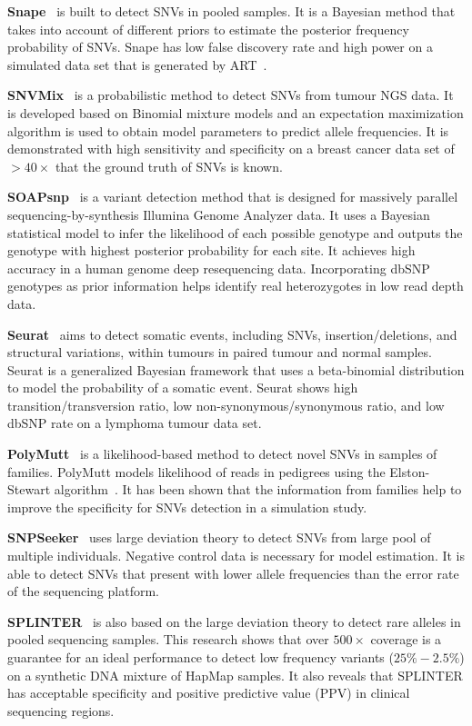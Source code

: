 \documentclass[a4,center,fleqn]{NAR}
\begin{document}
\textbf{Snape}~\citep{Raineri2012} is built to detect SNVs in pooled samples.
It is a Bayesian method that takes into account of different priors to estimate the posterior frequency probability of SNVs.
Snape has low false discovery rate and high power on a simulated data set that is generated by ART~\citep{huang2012art}.

\textbf{SNVMix}~\citep{Goya2010} is a probabilistic method to detect SNVs from tumour NGS data.
It is developed based on Binomial mixture models and an expectation maximization algorithm is used to obtain model parameters to predict allele frequencies.
It is demonstrated with high sensitivity and specificity on a breast cancer data set of $> 40 \times$ that the ground truth of SNVs is known.

\textbf{SOAPsnp}~\citep{Li2009} is a variant detection method that is designed for massively parallel sequencing-by-synthesis Illumina Genome Analyzer data.
It uses a Bayesian statistical model to infer the likelihood of each possible genotype and outputs the genotype with highest posterior probability for each site.
It achieves high accuracy in a human genome deep resequencing data.
Incorporating dbSNP genotypes as prior information helps identify real heterozygotes in low read depth data.

\textbf{Seurat}~\citep{Christoforides2013} aims to detect somatic events, including SNVs, insertion/deletions, and structural variations, within tumours in paired tumour and normal samples.
Seurat is a generalized Bayesian framework that uses a beta-binomial distribution to model the probability of a somatic event.
Seurat shows high transition/transversion ratio, low non-synonymous/synonymous ratio, and low dbSNP rate on a lymphoma tumour data set.

\textbf{PolyMutt}~\citep{li2012likelihood} is a likelihood-based method to detect novel SNVs in samples of families.
PolyMutt models likelihood of reads in pedigrees using the Elston-Stewart algorithm~\citep{elston1971general}.
It has been shown that the information from families help to improve the specificity for SNVs detection in a simulation study.

\textbf{SNPSeeker}~\citep{Druley2009} uses large deviation theory to detect SNVs from large pool of multiple individuals.
Negative control data is necessary for model estimation.
It is able to detect SNVs that present with lower allele frequencies than the error rate of the sequencing platform.

\textbf{SPLINTER}~\citep{Spencer2014} is also based on the large deviation theory to detect rare alleles in pooled sequencing samples.
This research shows that over $500 \times$ coverage is a guarantee for an ideal performance to detect low frequency variants ($25\% - 2.5\%$) on a synthetic DNA mixture of HapMap samples.
It also reveals that SPLINTER has acceptable specificity and positive predictive value (PPV) in clinical sequencing regions.
\end{document}
